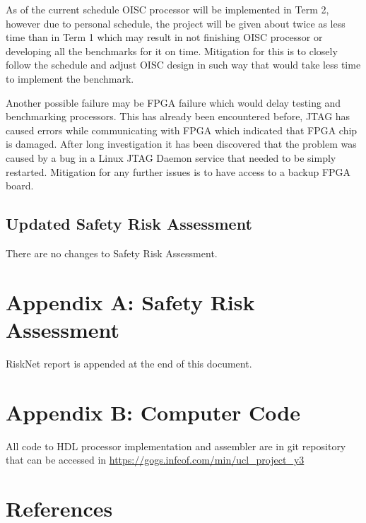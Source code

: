 \documentclass[a4paper,12pt]{article}
\begin{document}
\begin{multicols}{2}
As of the current schedule OISC processor will be implemented in Term 2, however due to personal schedule, the project will be given about twice as less time than in Term 1 which may result in not finishing OISC processor or developing all the benchmarks for it on time. Mitigation for this is to closely follow the schedule and adjust OISC design in such way that would take less time to implement the benchmark.

Another possible failure may be FPGA failure which would delay testing and benchmarking processors. This has already been encountered before, JTAG has caused errors while communicating with FPGA which indicated that FPGA chip is damaged. After long investigation it has been discovered that the problem was caused by a bug in a Linux JTAG Daemon service that needed to be simply restarted. Mitigation for any further issues is to have access to a backup FPGA board.

\subsection{Updated Safety Risk Assessment}
There are no changes to Safety Risk Assessment.

\end{multicols}
\pagebreak

\section{Appendix A: Safety Risk Assessment}
RiskNet report is appended at the end of this document.

\section{Appendix B: Computer Code}
All code to HDL processor implementation and assembler are in git repository that can be accessed in \url{https://gogs.infcof.com/min/ucl_project_y3}

\section{References}
\printbibliography


\end{document}

